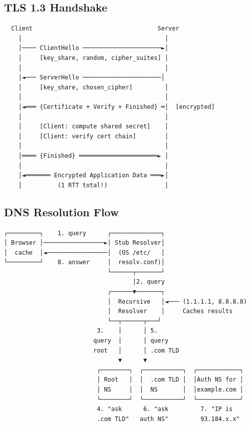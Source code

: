 \documentclass[11pt]{article}
\begin{document}
\subsection{TLS 1.3 Handshake}\label{tls-13-handshake}

\setcodelang{}

\begin{verbatim}
  Client                                   Server
    │                                        │
    │──── ClientHello ──────────────────────►│
    │     [key_share, random, cipher_suites] │
    │                                        │
    │◄─── ServerHello ──────────────────────│
    │     [key_share, chosen_cipher]         │
    │                                        │
    │◄═══ {Certificate + Verify + Finished} ═│  [encrypted]
    │                                        │
    │     [Client: compute shared secret]    │
    │     [Client: verify cert chain]        │
    │                                        │
    │════ {Finished} ══════════════════════► │
    │                                        │
    │◄═══════ Encrypted Application Data ═══►│
    │          (1 RTT total!)                │
\end{verbatim}

\subsection{DNS Resolution Flow}\label{dns-resolution-flow}

\setcodelang{}

\begin{verbatim}
┌─────────┐    1. query      ┌──────────────┐
│ Browser │─────────────────►│ Stub Resolver│
│  cache  │◄─────────────────│  (OS /etc/   │
└─────────┘    8. answer     │  resolv.conf)│
                             └──────┬───────┘
                                    │2. query
                             ┌──────▼───────┐
                             │  Recursive   │◄─── (1.1.1.1, 8.8.8.8)
                             │  Resolver    │     Caches results
                             └──┬──────┬───┘
                          3.    │      │ 5.
                         query  │      │ query
                         root   │      │ .com TLD
                                ▼      ▼
                          ┌────────┐  ┌───────────┐  ┌────────────┐
                          │ Root   │  │  .com TLD │  │Auth NS for │
                          │ NS     │  │  NS       │  │example.com │
                          └────────┘  └───────────┘  └────────────┘
                          4. "ask      6. "ask         7. "IP is
                          .com TLD"   auth NS"         93.184.x.x"
\end{verbatim}
\end{document}
